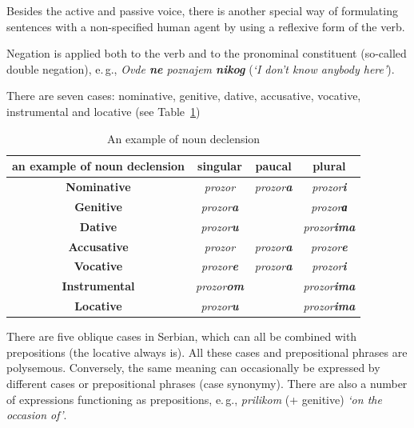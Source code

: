 \begin{multicols}{2}
Besides the active and passive voice, there is another special way of formulating sentences with a non-specified human agent by using a reflexive form of the verb. 

Negation is applied both to the verb and to the pronominal constituent (so-called double negation), e.\,g., \textit{Ovde \textbf{ne} poznajem \textbf{nikog}} (\textit{‘I don’t know anybody here’}).

There are seven cases: nominative, genitive, dative, accusative, vocative, instrumental and locative (see Table~\ref{declension}) 

\begin{table}[ht]
\begin{center}
\begin{tabular}{|c|c|c|c|}
\hline
{\textbf{an example of noun declension}} & {\textbf{singular}} & {\textbf{paucal}} & {\textbf{plural}} \\
\hline
{\textbf{Nominative}} & \textit{prozor} & \textit{prozor\textbf{a}} & \textit{prozor\textbf{i}} \\
\hline
{\textbf{Genitive}} & \textit{prozor\textbf{a}} & & \textit{prozor\textbf{а}} \\
\hline
{\textbf{Dative}} & \textit{prozor\textbf{u}} & & \textit{prozor\textbf{ima}} \\
\hline
{\textbf{Accusative}} & \textit{prozor} & \textit{prozor\textbf{a}} & \textit{prozor\textbf{e}} \\
\hline
{\textbf{Vocative}} & \textit{prozor\textbf{e}} & \textit{prozor\textbf{a}} & \textit{prozor\textbf{i}} \\
\hline
{\textbf{Instrumental}} & \textit{prozor\textbf{om}} & & \textit{prozor\textbf{ima}} \\
\hline
{\textbf{Locative}} & \textit{prozor\textbf{u}} & & \textit{prozor\textbf{ima}} \\
\hline
\end{tabular}
\end{center}
\caption{An example of noun declension}
\label{declension} 
\end{table}

There are five oblique cases in Serbian, which can all be combined with prepositions (the locative always is). All these cases and prepositional phrases are polysemous. Conversely, the same meaning can occasionally be expressed by different cases or prepositional phrases (case synonymy). There are also a number of expressions functioning as prepositions, e.\,g., \textit{prilikom} (+ genitive) \textit{‘on the occasion of’}.


\end{multicols}
